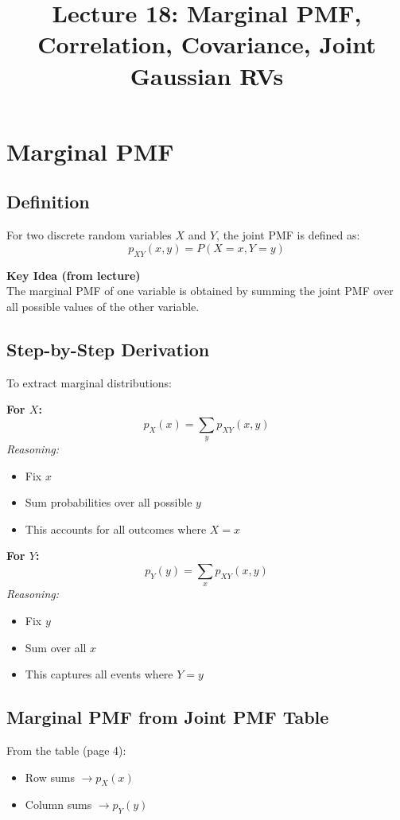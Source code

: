 \documentclass[12pt,a4paper]{article}
\title{\textbf{Lecture 18: Marginal PMF, Correlation, Covariance, Joint Gaussian RVs}}
\author{}
\date{}
\begin{document}
\maketitle

\section{Marginal PMF}

\subsection{Definition}
For two discrete random variables $X$ and $Y$, the joint PMF is defined as:
\[
p_{XY}(x,y) = P(X=x, Y=y)
\]

\textbf{Key Idea (from lecture)} \\
The marginal PMF of one variable is obtained by summing the joint PMF over all possible values of the other variable.

\subsection{Step-by-Step Derivation}
To extract marginal distributions:

\textbf{For $X$:}
\[
p_X(x) = \sum_{y} p_{XY}(x,y)
\]
\textit{Reasoning:}
\begin{itemize}
    \item Fix $x$
    \item Sum probabilities over all possible $y$
    \item This accounts for all outcomes where $X=x$
\end{itemize}

\textbf{For $Y$:}
\[
p_Y(y) = \sum_{x} p_{XY}(x,y)
\]
\textit{Reasoning:}
\begin{itemize}
    \item Fix $y$
    \item Sum over all $x$
    \item This captures all events where $Y=y$
\end{itemize}

\subsection{Marginal PMF from Joint PMF Table}
From the table (page 4):
\begin{itemize}
    \item Row sums $\rightarrow p_X(x)$
    \item Column sums $\rightarrow p_Y(y)$
\end{itemize}
\end{document}
